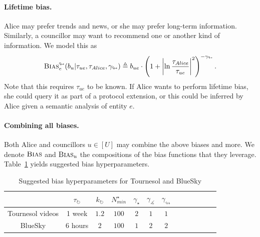 \paragraph{Lifetime bias.}
Alice may prefer trends and news, or she may prefer long-term information.
Similarly, a councillor may want to recommend one or another kind of information.
We model this as
\begin{align}
    \textsc{Bias}_e^\looparrowright (
        b_u | \tau_{ue}, \tau_{Alice}, \gamma_\looparrowright
    ) 
    \triangleq b_{ue} \cdot \left( 1 + 
        \left\lvert{\ln \frac{\tau_{Alice}}{\tau_{ue}}}\right\rvert^2 
    \right)^{-\gamma_\looparrowright}.
\end{align}
Note that this requires $\tau_{ue}$ to be known.
If Alice wants to perform lifetime bias,
she could query it as part of a \Veche{} protocol extension,
or this could be inferred by Alice given a semantic analysis of entity $e$.

\paragraph{Combining all biases.}
Both Alice and councillors $u \in [U]$ may combine the above biases and more.
We denote $\textsc{Bias}$ and $\textsc{Bias}_u$ the compositions of the bias functions 
that they leverage.
Table~\ref{table:bias_hyperparameters} yields suggested bias hyperparameters.

\begin{table}[!h]
\begin{center}
\begin{tabular}{ |c|c|c|c|c|c|c|c|c|c|c|c|c| } 
 \hline
                    & $\tau_\circlearrowright$ & $k_\circlearrowright$ & $N^{\star}_{min}$  & $\gamma_\star$ & $\gamma_\measuredangle$ & $\gamma_\looparrowright$ \\ \hline
 Tournesol videos   & 1 week                   & $1.2$                 & $100$              & $2$            & $1$                     & $1$                      \\ \hline
 BlueSky            & 6 hours                  & $2$                   & $100$              & $1$            & $2$                     & $2$                      \\ 
 \hline
\end{tabular}
\caption{Suggested bias hyperparameters for Tournesol and BlueSky} 
\label{table:bias_hyperparameters}
\end{center}
\end{table}


